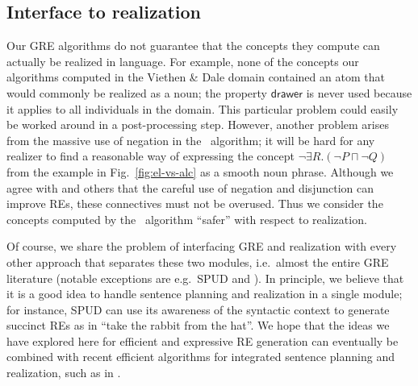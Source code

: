 \subsection{Interface to realization}


Our GRE algorithms do not guarantee that the concepts they compute can
actually be realized in language.  For example, none of the concepts
our algorithms computed in the Viethen \& Dale domain contained an
atom that would commonly be realized as a noun; the property
$\mathsf{drawer}$ is never used because it applies to all individuals
in the domain.  This particular problem could easily be worked around
in a post-processing step.  However, another problem arises from the
massive use of negation in the \alc\ algorithm; it will be hard for
any realizer to find a reasonable way of expressing the concept $\neg
\exists R.(\neg P \sqcap \neg Q)$ from the example in
Fig.~\ref{fig:el-vs-alc} as a smooth noun phrase.  Although we agree
with  and others that the
careful use of negation and disjunction can improve REs, these
connectives must not be overused.  Thus we consider the concepts
computed by the \el\ algorithm ``safer'' with respect to realization.

Of course, we share the problem of interfacing GRE and realization
with every other approach that separates these two modules, i.e.\
almost the entire GRE literature (notable exceptions are e.g.\ SPUD
\cite{Stone2003a} and \newcite{Horacek1997}).  In principle, we
believe that it is a good idea to handle sentence planning and
realization in a single module; for instance, SPUD can use its
awareness of the syntactic context to generate succinct REs as in
``take the rabbit from the hat''.  We hope that the ideas we have
explored here for efficient and expressive RE generation can
eventually be combined with recent efficient algorithms for integrated
sentence planning and realization, such as in \newcite{KolSto07}.

